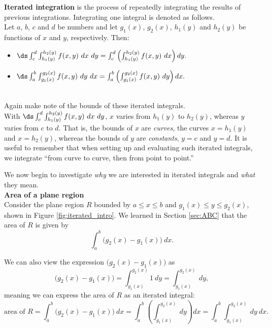{\textbf{Iterated integration} is the process of repeatedly integrating the results of previous integrations. Integrating one integral is denoted as follows.\\

Let $a$, $b$, $c$ and $d$ be numbers and let $g_1(x)$, $g_2(x)$, $h_1(y)$ and $h_2(y)$ be functions of $x$ and $y$, respectively. Then:
\begin{itemize}
	\item $\ds \int_c^d\int_{h_1(y)}^{h_2(y)} f(x,y)\ dx\ dy = \int_c^d\left(\int_{h_1(y)}^{h_2(y)} f(x,y)\ dx\right) dy.$
	\item $\ds \int_a^b\int_{g_1(x)}^{g_2(x)} f(x,y)\ dy\ dx = \int_a^b\left(\int_{g_1(x)}^{g_2(x)} f(x,y)\ dy\right) dx.$
\end{itemize}
}\\

Again make note of the bounds of these iterated integrals.\\
With $\ds \int_c^d\int_{h_1(y)}^{h_2(y)} f(x,y)\ dx\ dy$, $x$ varies from $h_1(y)$ to $h_2(y)$, whereas $y$ varies from $c$ to $d$. That is, the bounds of $x$ are \textit{curves}, the curves $x=h_1(y)$ and $x=h_2(y)$, whereas the bounds of $y$ are \textit{constants}, $y=c$ and $y=d$. It is useful to remember that when setting up and evaluating such iterated integrals, we integrate ``from curve to curve, then from point to point.''

We now begin to investigate \textit{why} we are interested in iterated integrals and \textit{what} they mean.\\

\noindent\textbf{\large Area of a plane region}\\

Consider the plane region $R$ bounded by $a\leq x\leq b$ and $g_1(x)\leq y\leq g_2(x)$, shown in Figure \ref{fig:iterated_intro}. We learned in Section \ref{sec:ABC} that the area of $R$ is given by $$\int_a^b \big(g_2(x)-g_1(x)\big)\ dx.$$

We can also view the expression $\big(g_2(x)-g_1(x)\big)$ as 
$$\big(g_2(x)-g_1(x)\big) = \int_{g_1(x)}^{g_2(x)} 1\ dy =\int_{g_1(x)}^{g_2(x)} \ dy,$$
meaning we can express the area of $R$ as an iterated integral:
$$\text{area of }R = \int_a^b \big(g_2(x)-g_1(x)\big)\ dx = \int_a^b\left(\int_{g_1(x)}^{g_2(x)} \ dy\right) dx =\int_a^b\int_{g_1(x)}^{g_2(x)} \ dy\ dx.$$

